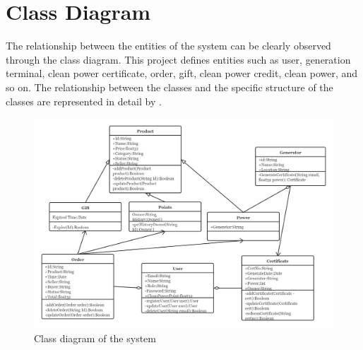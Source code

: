 \section{Class Diagram}
The relationship between the entities of the system can be clearly observed through the class diagram. This project defines entities such as user, generation terminal, clean power certificate, order, gift, clean power credit, clean power, and so on. The relationship between the classes and the specific structure of the classes are represented in detail by .
\begin{figure}[!htb]
    \centering
    \includegraphics[width=\textwidth]{img/classdiagram.png}
    \caption{Class diagram of the system}
    \label{fig:classdiagram}
\end{figure}

